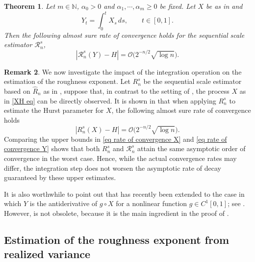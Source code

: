 \documentclass[12pt,reqno]{article}
\def\wh{\widehat}
\numberwithin{equation}{section}
\def\cR{{\mathscr R}}
\newtheorem{theorem}{Theorem}[section]
\theoremstyle{definition}
\newtheorem{remark}[theorem]{Remark}
\def\wh{\widehat}
\newcommand{\bN}{\mathbb{N}}
\begin{document}
\begin{theorem}\label{Theorem scale rate}
Let $m \in \bN$, $\alpha_0 > 0$ and $\alpha_1, \cdots, \alpha_m \ge 0$ be fixed. Let $X$ be as in  and 
\begin{equation*}
	Y_t = \int_0^t X_s \,ds, \qquad t \in [0,1].
\end{equation*}
 Then the following almost sure rate of convergence holds for the sequential scale estimator $\cR^s_n$,
		\begin{equation}\label{eq rate of convergence Y}
			|\cR^s_n(Y) - H| = \mathcal{O}\big(2^{-n/2}\sqrt{\log n}\big).
	\end{equation}
\end{theorem}


\begin{remark}\label{Remark scale rate}
We now investigate the impact of the integration operation on the estimation of the roughness exponent. Let $R^s_n$ be the sequential scale estimator based on $\wh R_n$ as in \cite[Definition 8.1]{HanSchiedHurst}, suppose that, in contrast to the setting of , the process $X$ as in \eqref{XH eq} can be directly observed. It is shown in \cite[Corollary 8.4]{HanSchiedHurst} that when applying $R^s_n$ to estimate the Hurst parameter for $X$, the following almost sure rate of convergence holds 
	\begin{equation}\label{eq rate of convergence X}
		|R^s_n(X) - H| = \mathcal{O}\big(2^{-n/2}\sqrt{\log n}\big).
	\end{equation}
  Comparing the upper bounds in \eqref{eq rate of convergence X} and \eqref{eq rate of convergence Y} shows that both $R^s_n$ and $\cR^s_n$ attain the same asymptotic order of convergence in the worst case. Hence, while the actual convergence rates may differ, the integration step does not worsen the asymptotic rate of decay guaranteed by these upper estimates.
   
    It is also worthwhile to point out that  has recently been extended to  the case in which $Y$ is the antiderivative of $g \circ X$ for a nonlinear function $g \in C^1[0,1]$; see \cite[Theorem 1.2]{HanSchiedSIFIN}.  However,  is not obsolete, because it is the main ingredient in the proof of \cite[Theorem 1.2]{HanSchiedSIFIN}.
\end{remark}

\subsection{Estimation of the roughness exponent from realized variance}\label{RV section}
\end{document}
